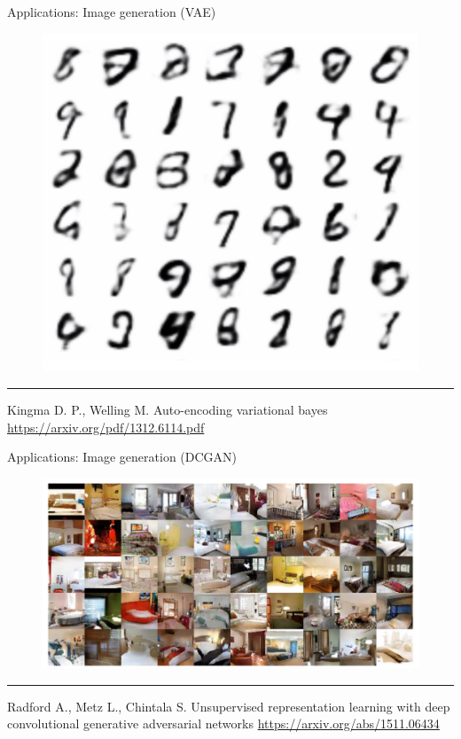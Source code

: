 \begin{frame}{Applications: Image generation (VAE)}
    \begin{figure}
        \centering
        \includegraphics[width=0.5\linewidth]{figs/vae.png}
        \label{fig:vae}
    \end{figure}
\vfill
\hrule\medskip
{\scriptsize Kingma D. P., Welling M. Auto-encoding variational bayes \href{https://arxiv.org/pdf/1312.6114.pdf}{https://arxiv.org/pdf/1312.6114.pdf}}
\end{frame}
\begin{frame}{Applications: Image generation (DCGAN)}
    \begin{figure}
        \centering
        \includegraphics[width=1.0\linewidth]{figs/dcgan.png}
        \label{fig:dcgan}
    \end{figure}
\vfill
\hrule\medskip
{\scriptsize Radford A., Metz L., Chintala S. Unsupervised representation learning with deep convolutional generative adversarial networks  \href{https://arxiv.org/abs/1511.06434}{https://arxiv.org/abs/1511.06434}}
\end{frame}
